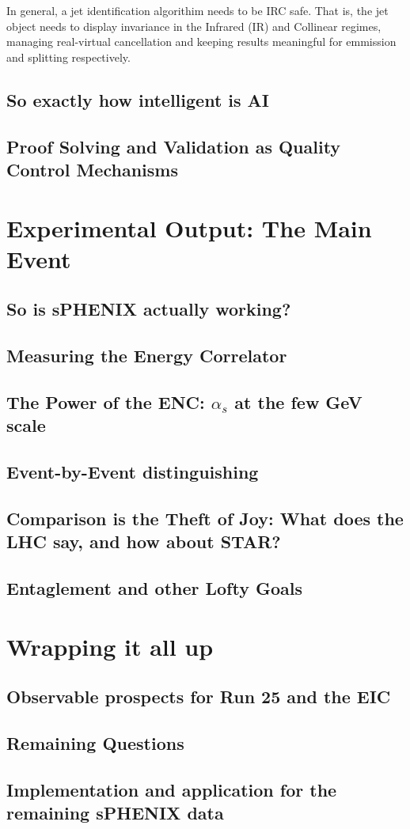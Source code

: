 \documentclass[letterpaper, 12pt, oneside]{book}
\theoremstyle{definition}
\begin{document}
In general, a jet identification algorithim needs to be IRC safe. 
That is, the jet object needs to display invariance in the Infrared (IR) and Collinear regimes, managing real-virtual cancellation and keeping results meaningful for emmission and splitting respectively. 

\chapter{So exactly how intelligent is AI}
\chapter{Proof Solving and Validation as Quality Control Mechanisms}
\part{Experimental Output: The Main Event}
\chapter{So is sPHENIX actually working?}
\chapter{Measuring the Energy Correlator}
\chapter{The Power of the ENC: $\alpha_s$ at the few GeV scale}
\chapter{Event-by-Event distinguishing}
\chapter{Comparison is the Theft of Joy: What does the LHC say, and how about STAR?}
\chapter{Entaglement and other Lofty Goals}
\part{Wrapping it all up}
\chapter{Observable prospects for Run 25 and the EIC}
\chapter{Remaining Questions}
\chapter{Implementation and application for the remaining sPHENIX data}
\singlespacing
\printbibliography
%
%
\end{document}
